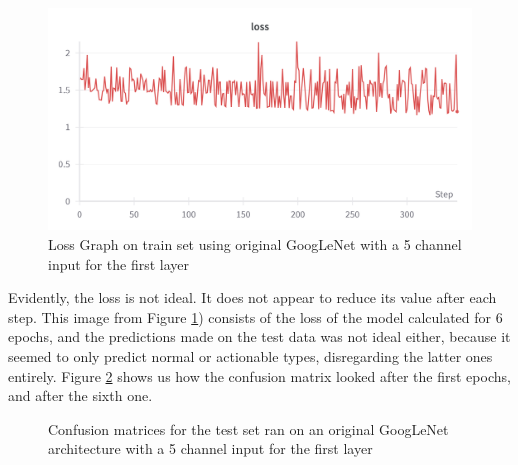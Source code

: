 \begin{figure}[!ht]
    \centering
    \includegraphics[width=1\textwidth]{figures/Figure8.png}
    \caption{Loss Graph on train set using original GoogLeNet with a 5 channel input for the first layer}
    \label{fig:fig8}
\end{figure}

Evidently, the loss is not ideal. It does not appear to reduce its value after each step. This image from Figure \ref{fig:fig8}) consists of the loss of the model calculated for 6 epochs, and the predictions made on the test data was not ideal either, because it seemed to only predict normal or actionable types, disregarding the latter ones entirely. Figure \ref{fig:fig9} shows us how the confusion matrix looked after the first epochs, and after the sixth one.

\begin{figure}[!ht]
    \caption{Confusion matrices for the test set ran on an original GoogLeNet architecture with a 5 channel input for the first layer}
    \label{fig:fig9}
\end{figure}

